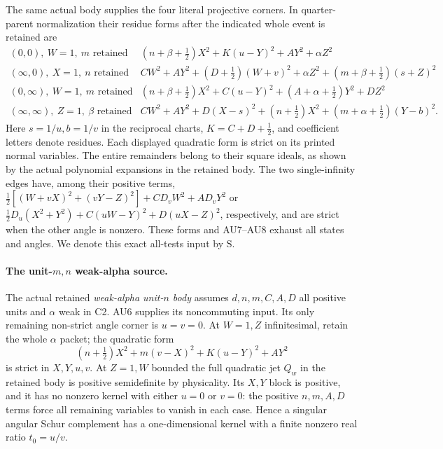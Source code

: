 The same actual body supplies the four literal projective
corners. In quarter-parent normalization their residue forms
after the indicated whole event is retained are
\[
\begin{array}{c|l}
 (0,0),\ W=1,\ m\text{ retained}
 &(n+\beta+\frac12)X^2+K(u-Y)^2+AY^2+\alpha Z^2\\
 (\infty,0),\ X=1,\ n\text{ retained}
 &CW^2+AY^2+(D+\frac12)(W+v)^2+
     \alpha Z^2+(m+\beta+\frac12)(s+Z)^2\\
 (0,\infty),\ W=1,\ m\text{ retained}
 &(n+\beta+\frac12)X^2+C(u-Y)^2+
     (A+\alpha+\frac12)Y^2+DZ^2\\
 (\infty,\infty),\ Z=1,\ \beta\text{ retained}
 &CW^2+AY^2+D(X-s)^2+
     (n+\frac12)X^2+(m+\alpha+\frac12)(Y-b)^2 .
\end{array}\tag{AU9}
\]
Here \(s=1/u,b=1/v\) in the reciprocal charts,
\(K=C+D+\frac12\), and coefficient letters denote residues.
Each displayed quadratic form is strict on its printed normal
variables. The entire remainders belong to their square ideals,
as shown by the actual polynomial expansions in the retained body.
The two single-infinity edges have, among their positive terms,
\(\frac12[(W+vX)^2+(vY-Z)^2]+C D_vW^2+A D_vY^2\)
or \(\frac12D_u(X^2+Y^2)+C(uW-Y)^2+D(uX-Z)^2\),
respectively, and are strict when the other angle is nonzero.
These forms and AU7--AU8 exhaust all states and angles.
We denote this exact all-tests input by \(\mathrm{S}\).

\paragraph{The unit-\(m,n\) weak-alpha source.}
The actual retained \emph{weak-alpha unit-\(n\) body} assumes
\(d,n,m,C,A,D\) all positive units and \(\alpha\) weak in C2.
AU6 supplies its noncommuting input.
Its only remaining non-strict angle corner is \(u=v=0\).
At \(W=1,Z\) infinitesimal, retain the whole \(\alpha\) packet;
the quadratic form
\[
 (n+\tfrac12)X^2+m(v-X)^2+K(u-Y)^2+AY^2
 \tag{AU10}
\]
is strict in \(X,Y,u,v\).
At \(Z=1,W\) bounded the full quadratic jet \(Q_w\) in the
retained body is positive semidefinite by physicality.
Its \(X,Y\) block is positive, and it has no nonzero kernel
with either \(u=0\) or \(v=0\): the positive \(n,m,A,D\) terms
force all remaining variables to vanish in each case.
Hence a singular angular Schur complement has a one-dimensional
kernel with a finite nonzero real ratio \(t_0=u/v\).


